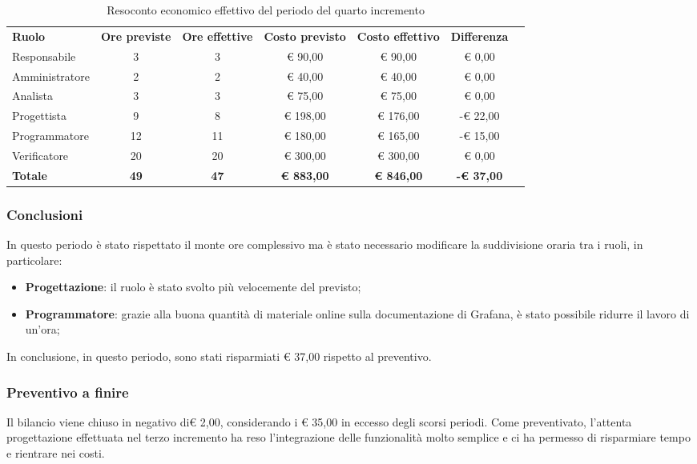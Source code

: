 \documentclass[../piano-di-progetto.tex]{subfiles}
\begin{document}
  \begin{table}[H]
    \centering
    \begin{tabular}{lcccccc}
      \rowcolor{lightgray}
      \textbf{Ruolo}  & \textbf{Ore previste} & \textbf{Ore effettive} & \textbf{Costo previsto} & \textbf{Costo effettivo} & \textbf{Differenza} \\
Responsabile    & 3           & 3           & € 90,00           & € 90,00            & € 0,00            \\
Amministratore  & 2           & 2           & € 40,00           & € 40,00            & € 0,00            \\
Analista        & 3           & 3           & € 75,00           & € 75,00            & € 0,00            \\
Progettista     & 9           & 8           & € 198,00          & € 176,00          & -€ 22,00          \\
Programmatore   & 12          & 11          & € 180,00          & € 165,00          & -€ 15,00          \\
Verificatore    & 20          & 20          & € 300,00          & € 300,00            & € 0,00            \\
\textbf{Totale} & \textbf{49} & \textbf{47} & \textbf{€ 883,00} & \textbf{€ 846,00} & \textbf{-€ 37,00}

    \end{tabular}
    \caption{Resoconto economico effettivo del periodo del quarto incremento}
  \end{table}


\subsubsection{Conclusioni}
In questo periodo è stato rispettato il monte ore complessivo ma è stato necessario modificare la suddivisione oraria tra i ruoli, in particolare:
\begin{itemize}
    \item \textbf{Progettazione}: il ruolo è stato svolto più velocemente del previsto;
    \item \textbf{Programmatore}: grazie alla buona quantità di materiale online sulla documentazione di Grafana, è stato possibile ridurre il lavoro di un'ora;
\end{itemize}
In conclusione, in questo periodo, sono stati risparmiati € 37,00 rispetto al preventivo.

\subsubsection{Preventivo a finire}
Il bilancio viene chiuso in negativo di€ 2,00, considerando i € 35,00 in eccesso degli scorsi periodi. Come preventivato, l'attenta progettazione effettuata nel terzo incremento ha reso l'integrazione delle funzionalità molto semplice e ci ha permesso di risparmiare tempo e rientrare nei costi. 
\end{document}
